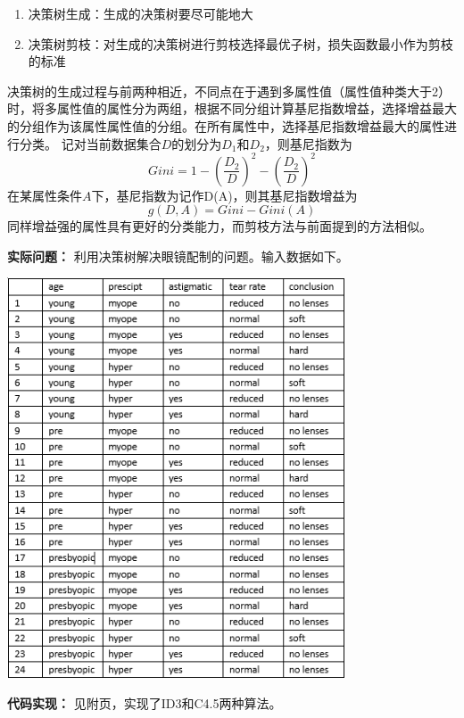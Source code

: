 \documentclass[12pt,a4paper]{article}
\theoremstyle{definition}
\begin{document}
\begin{enumerate}
{		\begin{enumerate}
			\item{决策树生成：生成的决策树要尽可能地大}
			\item{决策树剪枝：对生成的决策树进行剪枝选择最优子树，损失函数最小作为剪枝的标准}
		\end{enumerate}
		决策树的生成过程与前两种相近，不同点在于遇到多属性值（属性值种类大于2）时，将多属性值的属性分为两组，根据不同分组计算基尼指数增益，选择增益最大的分组作为该属性属性值的分组。在所有属性中，选择基尼指数增益最大的属性进行分类。
		记对当前数据集合$D$的划分为$D_1$和$D_2$，则基尼指数为
		$$Gini=1-(\frac{D_2}{D})^2-(\frac{D_2}{D})^2$$
		在某属性条件$A$下，基尼指数为记作D(A)，则其基尼指数增益为
		$$g(D,A)=Gini-Gini(A)$$
		同样增益强的属性具有更好的分类能力，而剪枝方法与前面提到的方法相似。
	}
\end{enumerate}
\textbf{实际问题：}
	利用决策树解决眼镜配制的问题。输入数据如下。
	\begin{center}
		\includegraphics[width=0.75\textwidth]{static.png}
	\end{center}

\textbf{代码实现：}
	见附页，实现了ID3和C4.5两种算法。
	
\end{document}
